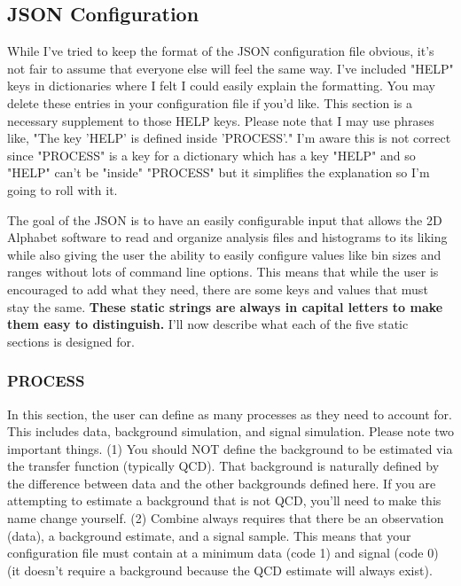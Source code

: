 \documentclass[letter]{article}
\begin{document}
    \subsection{JSON Configuration}
        While I've tried to keep the format of the JSON configuration file obvious, it's not fair to assume that everyone else will feel the same way. I've included "HELP" keys in dictionaries where I felt I could easily explain the formatting. You may delete these entries in your configuration file if you'd like. This section is a necessary supplement to those HELP keys. Please note that I may use phrases like, "The key 'HELP' is defined inside 'PROCESS'." I'm aware this is not correct since "PROCESS" is a key for a dictionary which has a key "HELP" and so "HELP" can't be "inside" "PROCESS" but it simplifies the explanation so I'm going to roll with it.  

        The goal of the JSON is to have an easily configurable input that allows the 2D Alphabet software to read and organize analysis files and histograms to its liking while also giving the user the ability to easily configure values like bin sizes and ranges without lots of command line options. This means that while the user is encouraged to add what they need, there are some keys and values that must stay the same. \textbf{These static strings are always in capital letters to make them easy to distinguish.} I'll now describe what each of the five static sections is designed for.

        \subsubsection{PROCESS}
            In this section, the user can define as many processes as they need to account for. This includes data, background simulation, and signal simulation. Please note two important things. (1) You should NOT define the background to be estimated via the transfer function (typically QCD). That background is naturally defined by the difference between data and the other backgrounds defined here. If you are attempting to estimate a background that is not QCD, you'll need to make this name change yourself. (2) Combine always requires that there be an observation (data), a background estimate, and a signal sample. This means that your configuration file must contain at a minimum data (code 1) and signal (code 0) (it doesn't require a background because the QCD estimate will always exist). 
\end{document}
